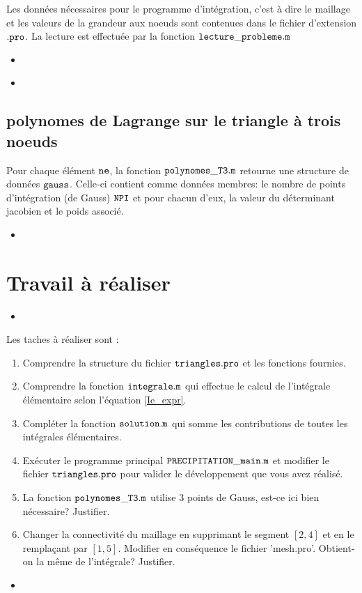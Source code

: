 \documentclass[a4paper, 10pt]{article}
\newcommand{\matlabscript}[2]
  {\begin{itemize}\item[]\end{itemize}}
\begin{document}
Les données nécessaires pour le programme d'intégration, c'est à dire le maillage et les valeurs de la grandeur aux noeuds sont contenues dans le fichier d'extension $\tt{.pro} \rm$. La lecture est effectuée par la fonction
$\tt{lecture\_probleme.m} \rm$

\matlabscript{lecture_probleme}{lecture des données du problème}

\matlabscript{triangles.pro}{fichier 'triangles.pro'}

\subsection {polynomes de Lagrange sur le triangle à trois noeuds}

Pour chaque élément $\tt{ne} \rm$, la fonction $\tt{polynomes\_T3.m} \rm$ retourne une structure
de données $\tt{gauss} \rm$. Celle-ci contient comme données membres: le nombre de points d'intégration
(de Gauss) $\tt{NPI} \rm$ et pour chacun d'eux, la valeur du déterminant jacobien et le poids associé.

\matlabscript{polynomes_T3}{polynomes de Lagrange}

\section {Travail à réaliser}

\matlabscript{integrale}{integrale élémentaire}

Les taches à réaliser sont :

\begin{enumerate}
\item  Comprendre la structure du fichier $\tt{triangles.pro} \rm$ et les fonctions fournies.
\item Comprendre la fonction $\tt{integrale.m} \rm$ qui effectue le calcul de l'intégrale élémentaire
selon l'équation \eqref{Ie_expr}.
\item Compléter la fonction  $\tt{solution.m} \rm$ qui somme les contributions de toutes les intégrales
élémentaires.
\item Exécuter le programme principal $\tt{PRECIPITATION\_main.m} \rm$ et modifier le fichier 
$\tt{triangles.pro} \rm$ pour valider le développement que vous avez réalisé.
\item  La fonction $\tt{polynomes\_T3.m} \rm$ utilise $3$ points de Gauss, est-ce ici bien nécessaire?
Justifier.
\item  Changer la connectivité du maillage en supprimant le segment $[2, 4]$ et en le remplaçant
par $[1, 5]$. Modifier en conséquence le fichier 'mesh.pro'. Obtient-on la même de l'intégrale? Justifier.
\end{enumerate} 

\matlabscript{PRECIPITATION_main}{programme principal}
\end{document}
